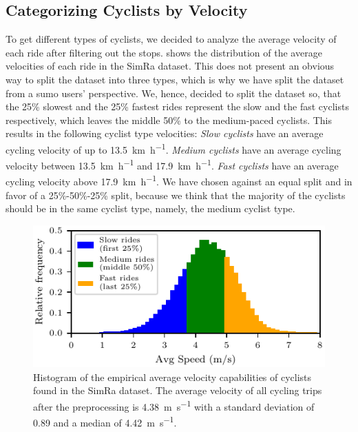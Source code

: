 \subsection{Categorizing Cyclists by Velocity}
\label{subsec:categorizing_by_velocity_preprocessing}
To get different types of cyclists, we decided to analyze the average velocity of each ride after filtering out the stops.
 shows the distribution of the average velocities of each ride in the SimRa dataset.
This does not present an obvious way to split the dataset into three types, which is why we have split the dataset from a \ac{sumo} users' perspective.
We, hence, decided to split the dataset so, that the \num{25}\% slowest and the \num{25}\% fastest rides represent the slow and the fast cyclists respectively, which leaves the middle \num{50}\% to the medium-paced cyclists.
This results in the following cyclist type velocities:
\textit{Slow cyclists} have an average cycling velocity of up to \SI{13.5}{\km\per\hour}.
\textit{Medium cyclists} have an average cycling velocity between \SI{13.5}{\km\per\hour} and \SI{17.9}{\km\per\hour}.
\textit{Fast cyclists} have an average cycling velocity above \SI{17.9}{\km\per\hour}.
We have chosen against an equal split and in favor of a \num{25}\%-\num{50}\%-\num{25}\% split, because we think that the majority of the cyclists should be in the same cyclist type, namely, the medium cyclist type.
\begin{figure}
  \centering
    \includegraphics[width=0.7\columnwidth]{fig/analysis_avg_velo_all.pdf}
    \caption{%
        Histogram of the empirical average velocity capabilities of cyclists found in the SimRa dataset. The average velocity of all cycling trips after the preprocessing is \SI{4.38}{\metre\per\second} with a standard deviation of \num{0.89} and a median of \SI{4.42}{\metre\per\second}.
    }%
    \label{fig:analysis_avg_vel_all}
\end{figure}

